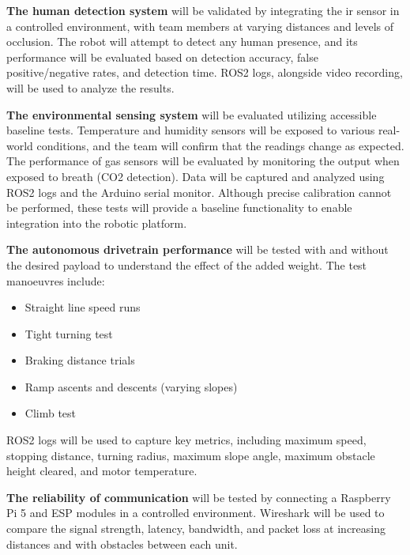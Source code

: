 \textbf{The human detection system} will be validated by integrating the \gls{ir} sensor in a controlled environment, with team members at varying distances and levels of occlusion. The robot will attempt to detect any human presence, and its performance will be evaluated based on detection accuracy, false positive/negative rates, and detection time. ROS2 logs, alongside video recording, will be used to analyze the results.

\textbf{The environmental sensing system} will be evaluated utilizing accessible baseline tests. Temperature and humidity sensors will be exposed to various real-world conditions, and the team will confirm that the readings change as expected. The performance of gas sensors will be evaluated by monitoring the output when exposed to breath (CO2 detection). Data will be captured and analyzed using ROS2 logs and the Arduino serial monitor. Although precise calibration cannot be performed, these tests will provide a baseline functionality to enable integration into the robotic platform. 

\textbf{The autonomous drivetrain performance} will be tested with and without the desired payload to understand the effect of the added weight. The test manoeuvres include:
\begin{itemize}
    \item Straight line speed runs
    \item Tight turning test
    \item Braking distance trials
    \item Ramp ascents and descents (varying slopes)
    \item Climb test
\end{itemize}

ROS2 logs will be used to capture key metrics, including maximum speed, stopping distance, turning radius, maximum slope angle, maximum obstacle height cleared, and motor temperature.

\textbf{The reliability of communication} will be tested by connecting a Raspberry Pi 5 and ESP modules in a controlled environment. Wireshark will be used to compare the signal strength, latency, bandwidth, and packet loss at increasing distances and with obstacles between each unit.